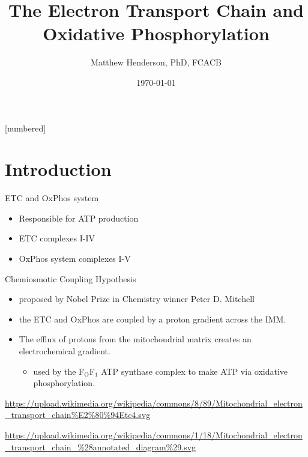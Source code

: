 \documentclass[presentation, smaller]{beamer}
\author{Matthew Henderson, PhD, FCACB}
\date{\today}
\title{The Electron Transport Chain and Oxidative Phosphorylation}
\institute[NSO]{Newborn Screening Ontario | The University of Ottawa}
\begin{document}
\maketitle


\vspace{220pt}
\beamertemplatenavigationsymbolsempty
{}[numbered]

\section{Introduction}
\label{sec:orge4956be}
\begin{frame}[label={sec:orgde995e8}]{ETC and OxPhos system}
\begin{itemize}
\item Responsible for ATP production
\item ETC complexes I-IV
\item OxPhos system complexes I-V
\end{itemize}
\begin{block}{Chemiosmotic Coupling Hypothesis}
\begin{itemize}
\item proposed by Nobel Prize in Chemistry winner Peter D. Mitchell
\item the ETC and OxPhos are coupled by a proton gradient across the IMM.
\item The efflux of protons from the mitochondrial matrix creates an electrochemical gradient.
\begin{itemize}
\item used by the F\(_{\text{O}}\)F\(_{\text{1}}\) ATP synthase complex to make ATP via oxidative phosphorylation.
\end{itemize}
\end{itemize}

\url{https://upload.wikimedia.org/wikipedia/commons/8/89/Mitochondrial\_electron\_transport\_chain\%E2\%80\%94Etc4.svg}

\url{https://upload.wikimedia.org/wikipedia/commons/1/18/Mitochondrial\_electron\_transport\_chain\_\%28annotated\_diagram\%29.svg}
\end{block}
\end{frame}
\end{document}
